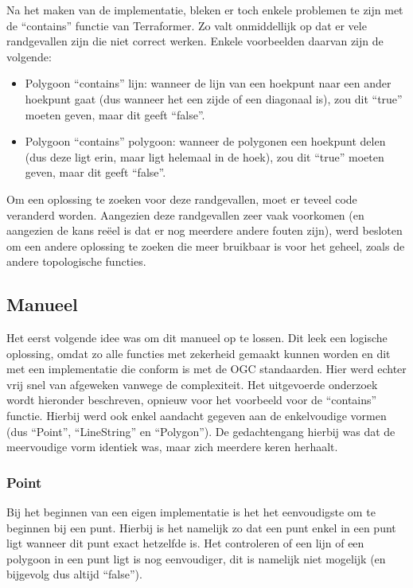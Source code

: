 Na het maken van de implementatie, bleken er toch enkele problemen te zijn met de ``contains'' functie van Terraformer. Zo valt onmiddellijk op dat er vele randgevallen zijn die niet correct werken. Enkele voorbeelden daarvan zijn de volgende:
\begin{itemize}
    \item Polygoon ``contains'' lijn: wanneer de lijn van een hoekpunt naar een ander hoekpunt gaat (dus wanneer het een zijde of een diagonaal is), zou dit ``true'' moeten geven, maar dit geeft ``false''.
    \item Polygoon ``contains'' polygoon: wanneer de polygonen een hoekpunt delen (dus deze ligt erin, maar ligt helemaal in de hoek), zou dit ``true'' moeten geven, maar dit geeft ``false''.
\end{itemize}

Om een oplossing te zoeken voor deze randgevallen, moet er teveel code veranderd worden. Aangezien deze randgevallen zeer vaak voorkomen (en aangezien de kans reëel is dat er nog meerdere andere fouten zijn), werd besloten om een andere oplossing te zoeken die meer bruikbaar is voor het geheel, zoals de andere topologische functies.

\subsection{Manueel}
Het eerst volgende idee was om dit manueel op te lossen. Dit leek een logische oplossing, omdat zo alle functies met zekerheid gemaakt kunnen worden en dit met een implementatie die conform is met de OGC standaarden. Hier werd echter vrij snel van afgeweken vanwege de complexiteit. Het uitgevoerde onderzoek wordt hieronder beschreven, opnieuw voor het voorbeeld voor de ``contains'' functie. Hierbij werd ook enkel aandacht gegeven aan de enkelvoudige vormen (dus ``Point'', ``LineString'' en ``Polygon''). De gedachtengang hierbij was dat de meervoudige vorm identiek was, maar zich meerdere keren herhaalt.

\subsubsection{Point}
Bij het beginnen van een eigen implementatie is het het eenvoudigste om te beginnen bij een punt. Hierbij is het namelijk zo dat een punt enkel in een punt ligt wanneer dit punt exact hetzelfde is. Het controleren of een lijn of een polygoon in een punt ligt is nog eenvoudiger, dit is namelijk niet mogelijk (en bijgevolg dus altijd ``false'').  

